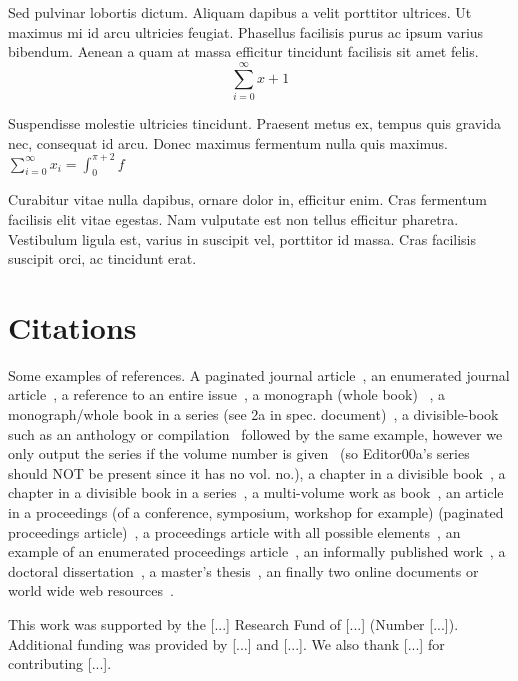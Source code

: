 \documentclass[sigconf, nonacm]{acmart}
\begin{document}
Sed pulvinar lobortis dictum. Aliquam dapibus a velit porttitor ultrices. Ut maximus mi id arcu ultricies feugiat. Phasellus facilisis purus ac ipsum varius bibendum. Aenean a quam at massa efficitur tincidunt facilisis sit amet felis. 
\begin{displaymath}
  \sum_{i=0}^{\infty} x + 1
\end{displaymath}

Suspendisse molestie ultricies tincidunt. Praesent metus ex, tempus quis gravida nec, consequat id arcu. Donec maximus fermentum nulla quis maximus.
$ \sum_{i=0}^{\infty}x_i=\int_{0}^{\pi+2} f$

Curabitur vitae nulla dapibus, ornare dolor in, efficitur enim. Cras fermentum facilisis elit vitae egestas. Nam vulputate est non tellus efficitur pharetra. Vestibulum ligula est, varius in suscipit vel, porttitor id massa. Cras facilisis suscipit orci, ac tincidunt erat.

\section{Citations}

Some examples of references. A paginated journal article~\cite{Abril07}, an enumerated journal article~\cite{Cohen07}, a reference to an entire issue~\cite{JCohen96}, a monograph (whole book) ~\cite{Kosiur01}, a monograph/whole book in a series (see 2a in spec. document)~\cite{Harel79}, a divisible-book such as an anthology or compilation~\cite{Editor00} followed by the same example, however we only output the series if the volume number is given~\cite{Editor00a} (so Editor00a's series should NOT be present since it has no vol. no.), a chapter in a divisible book~\cite{Spector90}, a chapter in a divisible book in a series~\cite{Douglass98}, a multi-volume work as book~\cite{Knuth97}, an article in a proceedings (of a conference, symposium, workshop for example) (paginated proceedings article)~\cite{Andler79}, a proceedings article with all possible elements~\cite{Smith10}, an example of an enumerated proceedings article~\cite{VanGundy07}, an informally published work~\cite{Harel78}, a doctoral dissertation~\cite{Clarkson85}, a master's thesis~\cite{anisi03}, an finally two online documents or world wide web resources~\cite{Thornburg01, Ablamowicz07}.

\begin{acks}
 This work was supported by the [...] Research Fund of [...] (Number [...]). Additional funding was provided by [...] and [...]. We also thank [...] for contributing [...].
\end{acks}




\end{document}
